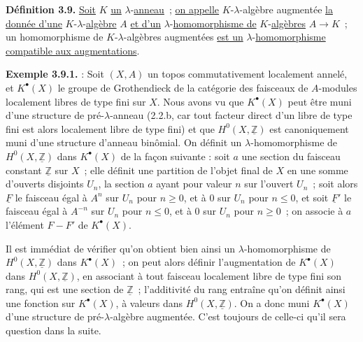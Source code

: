 
\textbf{Définition 3.9.} \uline{Soit} \(K\) \uline{un} \(\lambda\)-\uline{anneau}~; \uline{on appelle} \(K\)-\(\lambda\)-algèbre augmentée \uline{la donnée d'une} \(K\)-\(\lambda\)-\uline{algèbre} \(A\) \uline{et d'un} \(\lambda\)-\uline{homomorphisme de} \(K\)-\uline{algèbres} \(A\to K\)~; un homomorphisme de \(K\)-\(\lambda\)-algèbres augmentées \uline{est un} \(\lambda\)-\uline{homomorphisme compatible aux augmentations}.

\textbf{Exemple 3.9.1.} : Soit \((X,A)\) un topos commutativement localement annelé, et \(K^\bullet(X)\) le groupe de Grothendieck de la catégorie des faisceaux de \(A\)-modules localement libres de type fini sur \(X\). Nous avons vu que \(K^\bullet(X)\) peut être muni d'une structure de pré-\(\lambda\)-anneau (2.2.b, car tout facteur direct d'un libre de type fini est alors localement libre de type fini) et que \(H^0(X,\underline{\mathbb Z})\) est canoniquement muni d'une structure d'anneau binômial. On définit un \(\lambda\)-homomorphisme de \(H^0(X,\underline{\mathbb Z})\) dans \(K^\bullet(X)\) de la façon suivante : soit \(a\) une section du faisceau constant \(\underline{\mathbb Z}\) sur \(X\)~; elle définit une partition de l'objet final de \(X\) en une somme d'ouverts disjoints \(U_n\), la section \(a\) ayant pour valeur \(n\) sur l'ouvert \(U_n\)~; soit alors \(\underline{F}\) le faisceau égal à \(A^n\) sur \(U_n\) pour \(n\ge0\), et à \(0\) sur \(U_n\) pour \(n\le0\), et soit \(\underline{F}'\) le faisceau égal à \(A^{-n}\) sur \(U_n\) pour \(n\le0\), et à \(0\) sur \(U_n\) pour \(n\ge0\)~; on associe à \(a\) l'élément \(F-F'\) de \(K^\bullet(X)\).

Il est immédiat de vérifier qu'on obtient bien ainsi un \(\lambda\)-homomorphisme de \(H^0(X,\underline{\mathbb Z})\) dans \(K^\bullet(X)\)~; on peut alors définir l'augmentation de \(K^\bullet(X)\) dans \(H^0(X,\underline{\mathbb Z})\), en associant à tout faisceau localement libre de type fini son rang, qui est une section de \(\underline{\mathbb Z}\)~; l'additivité du rang entraîne qu'on définit ainsi une fonction sur \(K^\bullet(X)\), à valeurs dans \(H^0(X,\underline{\mathbb Z})\). On a donc muni \(K^\bullet(X)\) d'une structure de pré-\(\lambda\)-algèbre augmentée. C'est toujours de celle-ci qu'il sera question dans la suite.

